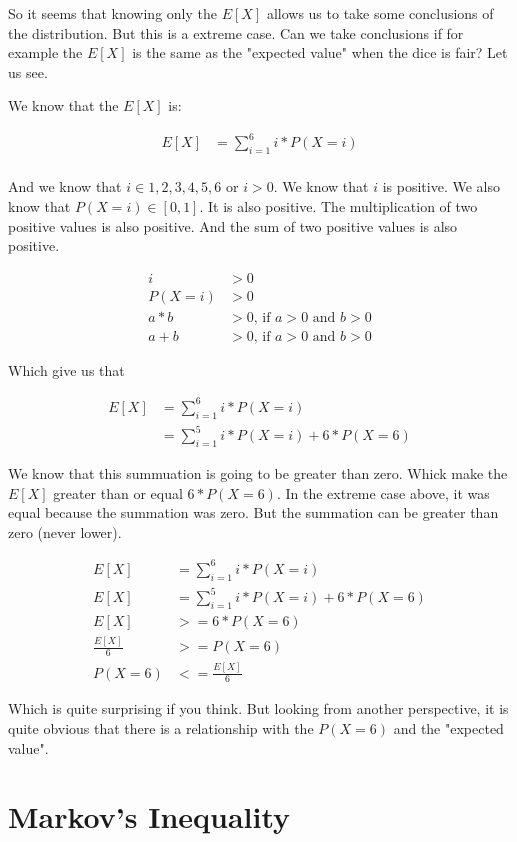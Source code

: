 \documentclass[10pt,a4paper]{book}
\begin{document}
So it seems that knowing only the $E[X]$ allows us to take some conclusions of the distribution. But this is a extreme case. Can we take conclusions if for example the $E[X]$ is the same as the "expected value" when the dice is fair? Let us see.

We know that the $E[X]$ is:

\begin{align*}
	E[X] &= \sum_{i=1}^{6}{i*P(X=i)}\\
\end{align*}

And we know that $i \in {1,2,3,4,5,6}$ or $i > 0$. We know that $i$ is positive. We also know that $P(X = i) \in [0,1]$. It is also positive. The multiplication of two positive values is also positive. And the sum of two positive values is also positive.

\begin{align*}
	i &> 0\\
	P(X = i) &> 0\\
	a * b &> 0 \text{, if } a > 0 \text{ and } b > 0\\
	a + b &> 0 \text{, if } a > 0 \text{ and } b > 0	
\end{align*}

Which give us that 

\begin{align*}
	E[X] &= \sum_{i=1}^{6}{i*P(X=i)}\\
	&= \sum_{i=1}^{5}{i*P(X=i)} + 6*P(X=6)
\end{align*}

We know that this summuation is going to be greater than zero. Whick make the $E[X]$ greater than or equal $6*P(X=6)$. In the extreme case above, it was equal because the summation was zero. But the summation can be greater than zero (never lower).

\begin{align*}
	E[X] &= \sum_{i=1}^{6}{i*P(X=i)}\\
	E[X] &= \sum_{i=1}^{5}{i*P(X=i)} + 6*P(X=6)\\
	E[X] &>= 6*P(X=6)\\
	\frac{E[X]}{6} &>= P(X=6)\\
	P(X=6) &<= \frac{E[X]}{6}
\end{align*}

Which is quite surprising if you think. But looking from another perspective, it is quite obvious that there is a relationship with the $P(X=6)$ and the "expected value".
	
\section{Markov's Inequality}
\end{document}
